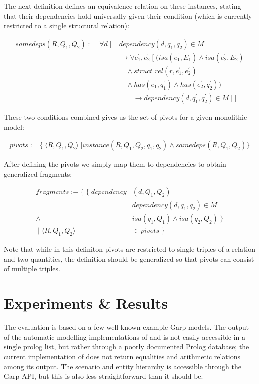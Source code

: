 \documentclass{article} %
\begin{document}
The next definition defines an equivalence relation on these instances,
stating that their dependencies hold universally given their condition (which
is currently restricted to a single structural relation):

\begin{align*}
samedeps(R, Q_1, Q_2) := \; \forall d \; [ \; &dependency(d, q_1, q_2) \in M \\
	& 	\rightarrow \forall e^\prime_1, e^\prime_2 \; [ \; ( isa(e^\prime_1, E_1) \land isa(e^\prime_2, E_2)  \\
	&	\quad 	\land struct\_rel(r, e^\prime_1, e^\prime_2)  \\
	&	\quad 	\land has(e^\prime_1, q^\prime_1) \land has(e^\prime_2, q^\prime_2) ) \\
	& \qquad \rightarrow dependency(d, q^\prime_1, q^\prime_2) \in M \; ] \; ]
\end{align*}

These two conditions combined gives us the set of pivots for a given
monolithic model:

\begin{align*}
pivots := \{ \; \langle R, Q_1, Q_2 \rangle \; | instance(R, Q_1, Q_2, q_1, q_2) \land samedeps(R, Q_1, Q_2) \} 
\end{align*}

After defining the pivots we simply map them to dependencies to obtain
generalized fragments:

\begin{align*}
fragments := \{ \; \{ \; dependency&(d, Q_1, Q_2) \; | \; \\
		& dependency(d, q_1, q_2)  \in M \\
		\land \; & isa(q_1, Q_1)  \land isa(q_2, Q_2) \; \} \\
	\; | \; \langle R, Q_1, Q_2 \rangle &\in pivots \; \}
\end{align*}

Note that while in this definiton pivots are restricted to single triples of a
relation and two quantities, the definition should be generalized so that
pivots can consist of multiple triples.

\section{Experiments \& Results}

The evaluation is based on a few well known example Garp models. The output of
the automatic modelling implementations of \cite{buisman} and
\cite{vanweelden} is not easily accessible in a single prolog list, but rather
through a poorly documented Prolog database; the current implementation of
\cite{vanweelden} does not return equalities and arithmetic relations among
its output. The scenario and entity hierarchy is accessible through the Garp
API, but this is also less straightforward than it should be. 
\end{document}
